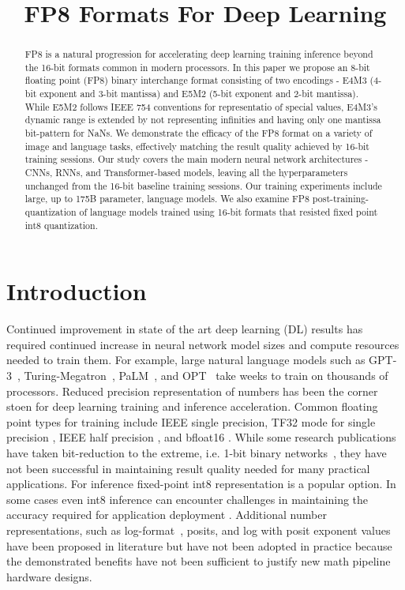 \title{FP8 Formats For Deep Learning}

\begin{abstract}
FP8 is a natural progression for accelerating deep learning training inference beyond the 16-bit formats common in modern processors. In this paper we propose an 8-bit floating point (FP8) binary interchange format consisting of two encodings - E4M3 (4-bit exponent and 3-bit mantissa) and E5M2 (5-bit exponent and 2-bit mantissa). While E5M2 follows IEEE 754 conventions for representatio of special values, E4M3's dynamic range is extended by not representing infinities and having only one mantissa bit-pattern for NaNs. We demonstrate the efficacy of the FP8 format on a variety of image and language tasks, effectively matching the result quality achieved by 16-bit training sessions. Our study covers the main modern neural network architectures - CNNs, RNNs, and Transformer-based models, leaving all the hyperparameters unchanged from the 16-bit baseline training sessions. Our training experiments include large, up to 175B parameter, language models. We also examine FP8 post-training-quantization of language models trained using 16-bit formats that resisted fixed point int8 quantization.
\end{abstract}

\section{Introduction}
Continued improvement in state of the art deep learning (DL) results has required continued increase in neural network model sizes and  compute resources needed to train them. For example, large natural language models such as GPT-3~\cite{gpt3_2020}, Turing-Megatron~\cite{megatron_2022}, PaLM~\cite{palm_2022}, and OPT~\cite{opt_2022} take weeks to train on thousands of processors. Reduced precision representation of numbers has been the corner stoen for deep learning training and inference acceleration. Common floating point types for training include IEEE single precision, TF32 mode for single precision \cite{tf32_2021}, IEEE half precision \cite{mpt2017}, and bfloat16 \cite{bfloat2020}. While some research publications have taken bit-reduction to the extreme, i.e. 1-bit binary networks~\cite{bin_conn_2015, bnn_2016, dorefa_2016, lqnet_2018, xnornet_2016}, they have not been successful in maintaining result quality needed for many practical applications. For inference fixed-point int8 representation is a popular option. In some cases even int8 inference can encounter challenges in maintaining the accuracy required for application deployment \cite{fb_int8_accel}. Additional number representations, such as log-format~\cite{log_2016, log_2017}, posits, and log with posit exponent values \cite{log_posit_2018} have been proposed in literature but have not been adopted in practice because the demonstrated benefits have not been sufficient to justify new math pipeline hardware designs.

